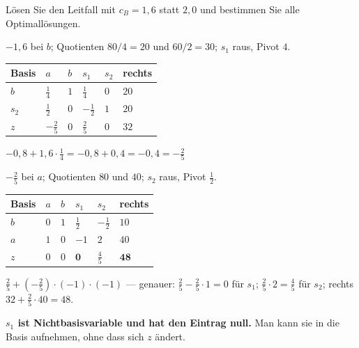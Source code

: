 \begin{aufgabe}
Lösen Sie den Leitfall mit $c_B = 1{,}6$ statt $2{,}0$ und bestimmen Sie alle Optimallösungen.

\loesung
{}
$-1{,}6$ bei $b$; Quotienten $80/4=20$ und $60/2=30$; $s_1$ raus, Pivot $4$.

\begin{center}
{\small
\renewcommand{\arraystretch}{1.46}
\begin{tabular}{@{}P{1.6cm}P{1.4cm}P{1.4cm}P{1.4cm}P{1.4cm}P{1.4cm}@{}}
\toprule
\textbf{Basis} & $a$ & $b$ & $s_1$ & $s_2$ & \textbf{rechts}\\
\midrule
$b$ & $\tfrac14$ & $1$ & $\tfrac14$ & $0$ & $20$\\
$s_2$ & $\tfrac12$ & $0$ & $-\tfrac12$ & $1$ & $20$\\
\midrule
$z$ & $-\tfrac25$ & $0$ & $\tfrac25$ & $0$ & $32$\\
\bottomrule
\end{tabular}}
\end{center}

 $-0{,}8 + 1{,}6\cdot\frac14 = -0{,}8+0{,}4 = -0{,}4 = -\frac25$ \checkmark

$-\frac25$ bei $a$; Quotienten $80$ und $40$; $s_2$ raus, Pivot $\frac12$.

\begin{center}
{\small
\renewcommand{\arraystretch}{1.46}
\begin{tabular}{@{}P{1.6cm}P{1.4cm}P{1.4cm}P{1.4cm}P{1.4cm}P{1.4cm}@{}}
\toprule
\textbf{Basis} & $a$ & $b$ & $s_1$ & $s_2$ & \textbf{rechts}\\
\midrule
$b$ & $0$ & $1$ & $\tfrac12$ & $-\tfrac12$ & $10$\\
$a$ & $1$ & $0$ & $-1$ & $2$ & $40$\\
\midrule
$z$ & $0$ & $0$ & $\mathbf{0}$ & $\tfrac45$ & $\mathbf{48}$\\
\bottomrule
\end{tabular}}
\end{center}

 $\frac25 + \left(-\frac25\right)\cdot(-1)\cdot(-1)$ --- genauer: $\frac25 - \frac25 \cdot 1 = 0$ für $s_1$; $\frac25 \cdot 2 = \frac45$ für $s_2$; rechts $32 + \frac25\cdot 40 = 48$.

\begin{center}
\begin{minipage}{0.9\textwidth}
\textbf{$s_1$ ist Nichtbasisvariable und hat den Eintrag null.} Man kann sie in die Basis aufnehmen, ohne dass sich $z$ ändert.
\end{minipage}
\end{center}


\end{aufgabe}
